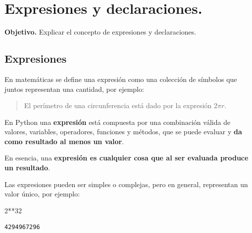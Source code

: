 \documentclass[
  spanish,
  letterpaper,
]{scrbook}
\newenvironment{Shaded}{\begin{snugshade}}{\end{snugshade}}
\newcommand{\DecValTok}[1]{\textcolor[rgb]{0.68,0.00,0.00}{#1}}
\newcommand{\OperatorTok}[1]{\textcolor[rgb]{0.37,0.37,0.37}{#1}}
\theoremstyle{definition}
\theoremstyle{remark}
\begin{document}
\chapter{Expresiones y
declaraciones.}\label{sec-d-expresiones-declaracione}

\textbf{Objetivo.} Explicar el concepto de expresiones y declaraciones.

\section{Expresiones}\label{expresiones}

En matemáticas se define una expresión como una colección de símbolos
que juntos representan una cantidad, por ejemplo:

\begin{quote}
El perímetro de una circunferencia está dado por la expresión
2\(\pi r\).
\end{quote}

En Python una \textbf{expresión} está compuesta por una combinación
válida de valores, variables, operadores, funciones y métodos, que se
puede evaluar y \textbf{da como resultado al menos un valor}.

\begin{tcolorbox}[enhanced jigsaw, colframe=quarto-callout-tip-color-frame, opacityback=0, toprule=.15mm, colback=white, coltitle=black, leftrule=.75mm, arc=.35mm, breakable, left=2mm, bottomtitle=1mm, rightrule=.15mm, bottomrule=.15mm, colbacktitle=quarto-callout-tip-color!10!white, toptitle=1mm, titlerule=0mm, opacitybacktitle=0.6, title=\textcolor{quarto-callout-tip-color}{\faLightbulb}\hspace{0.5em}{Tip}]

En esencia, una \textbf{expresión es cualquier cosa que al ser evaluada
produce un resultado}.

\end{tcolorbox}

Las expresiones pueden ser simples o complejas, pero en general,
representan un valor único, por ejemplo:

\begin{Shaded}
\begin{Highlighting}[]
\DecValTok{2}\OperatorTok{**}\DecValTok{32}
\end{Highlighting}
\end{Shaded}

\begin{verbatim}
4294967296
\end{verbatim}
\end{document}
